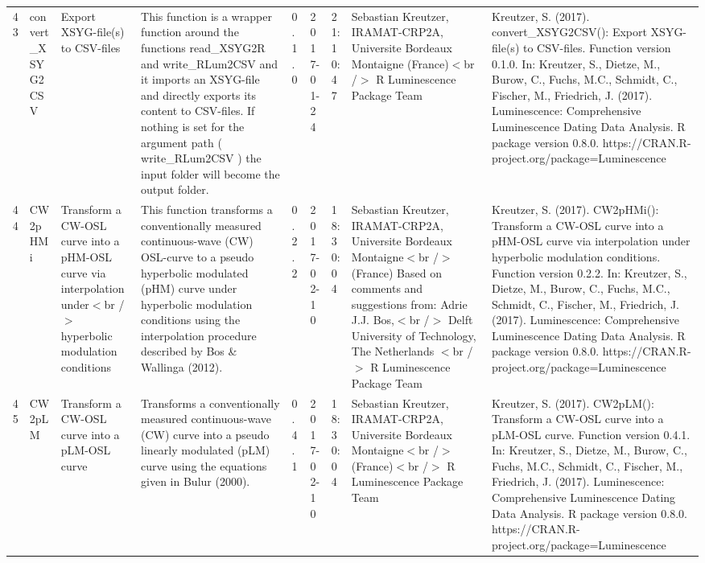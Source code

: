 \begin{table}[ht]
\begin{tabular}{rllllllll}
 \\ 
  43 & convert\_XSYG2CSV & Export XSYG-file(s) to CSV-files & This function is a wrapper function around the functions  read\_XSYG2R  and write\_RLum2CSV  and it imports an XSYG-file and directly exports its content to CSV-files. If nothing is set for the argument  path  ( write\_RLum2CSV ) the input folder will become the output folder. & 0.1.0 & 2017-01-24 & 21:10:47
 & Sebastian Kreutzer, IRAMAT-CRP2A, Universite Bordeaux Montaigne (France)$<$br /$>$  R Luminescence Package Team & Kreutzer, S. (2017). convert\_XSYG2CSV(): Export XSYG-file(s) to CSV-files. Function version 0.1.0. In: Kreutzer, S., Dietze, M., Burow, C., Fuchs, M.C., Schmidt, C., Fischer, M., Friedrich, J. (2017). Luminescence: Comprehensive Luminescence Dating Data Analysis. R package version 0.8.0. https://CRAN.R-project.org/package=Luminescence
 \\ 
  44 & CW2pHMi & Transform a CW-OSL curve into a pHM-OSL curve via interpolation under$<$br /$>$ hyperbolic modulation conditions & This function transforms a conventionally measured continuous-wave (CW) OSL-curve to a pseudo hyperbolic modulated (pHM) curve under hyperbolic modulation conditions using the interpolation procedure described by Bos \& Wallinga (2012). & 0.2.2 & 2017-02-10 & 18:30:04
 & Sebastian Kreutzer, IRAMAT-CRP2A, Universite Bordeaux Montaigne$<$br /$>$ (France)   Based on comments and suggestions from:  Adrie J.J. Bos,$<$br /$>$ Delft University of Technology, The Netherlands $<$br /$>$  R Luminescence Package Team & Kreutzer, S. (2017). CW2pHMi(): Transform a CW-OSL curve into a pHM-OSL curve via interpolation under hyperbolic modulation conditions. Function version 0.2.2. In: Kreutzer, S., Dietze, M., Burow, C., Fuchs, M.C., Schmidt, C., Fischer, M., Friedrich, J. (2017). Luminescence: Comprehensive Luminescence Dating Data Analysis. R package version 0.8.0. https://CRAN.R-project.org/package=Luminescence
 \\ 
  45 & CW2pLM & Transform a CW-OSL curve into a pLM-OSL curve & Transforms a conventionally measured continuous-wave (CW) curve into a pseudo linearly modulated (pLM) curve using the equations given in Bulur (2000). & 0.4.1 & 2017-02-10 & 18:30:04
 & Sebastian Kreutzer, IRAMAT-CRP2A, Universite Bordeaux Montaigne$<$br /$>$ (France)$<$br /$>$  R Luminescence Package Team & Kreutzer, S. (2017). CW2pLM(): Transform a CW-OSL curve into a pLM-OSL curve. Function version 0.4.1. In: Kreutzer, S., Dietze, M., Burow, C., Fuchs, M.C., Schmidt, C., Fischer, M., Friedrich, J. (2017). Luminescence: Comprehensive Luminescence Dating Data Analysis. R package version 0.8.0. https://CRAN.R-project.org/package=Luminescence

\end{tabular}
\end{table}

